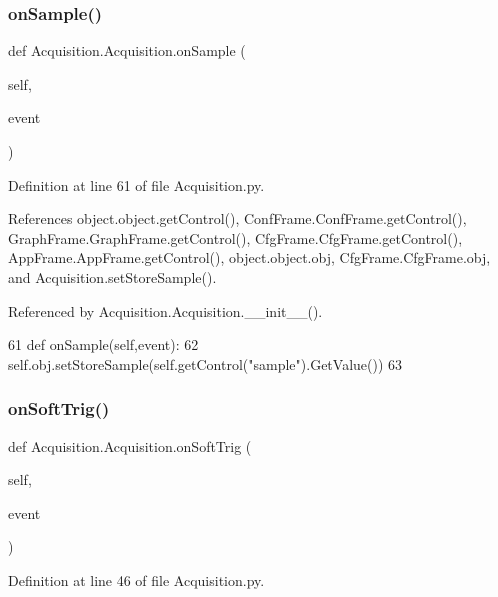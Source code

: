 \subsubsection{\texorpdfstring{on\+Sample()}{onSample()}}
{\footnotesize\ttfamily def Acquisition.\+Acquisition.\+on\+Sample (\begin{DoxyParamCaption}\item[{}]{self,  }\item[{}]{event }\end{DoxyParamCaption})}



Definition at line 61 of file Acquisition.\+py.



References object.\+object.\+get\+Control(), Conf\+Frame.\+Conf\+Frame.\+get\+Control(), Graph\+Frame.\+Graph\+Frame.\+get\+Control(), Cfg\+Frame.\+Cfg\+Frame.\+get\+Control(), App\+Frame.\+App\+Frame.\+get\+Control(), object.\+object.\+obj, Cfg\+Frame.\+Cfg\+Frame.\+obj, and Acquisition.\+set\+Store\+Sample().



Referenced by Acquisition.\+Acquisition.\+\_\+\+\_\+init\+\_\+\+\_\+().


\begin{DoxyCode}
61     \textcolor{keyword}{def }onSample(self,event):
62         self.obj.setStoreSample(self.getControl(\textcolor{stringliteral}{"sample"}).GetValue())
63 
\end{DoxyCode}
\mbox{\label{classAcquisition_1_1Acquisition_aa686f47e8d19e10efa43c3330fd7d19b}} 
\subsubsection{\texorpdfstring{on\+Soft\+Trig()}{onSoftTrig()}}
{\footnotesize\ttfamily def Acquisition.\+Acquisition.\+on\+Soft\+Trig (\begin{DoxyParamCaption}\item[{}]{self,  }\item[{}]{event }\end{DoxyParamCaption})}



Definition at line 46 of file Acquisition.\+py.



